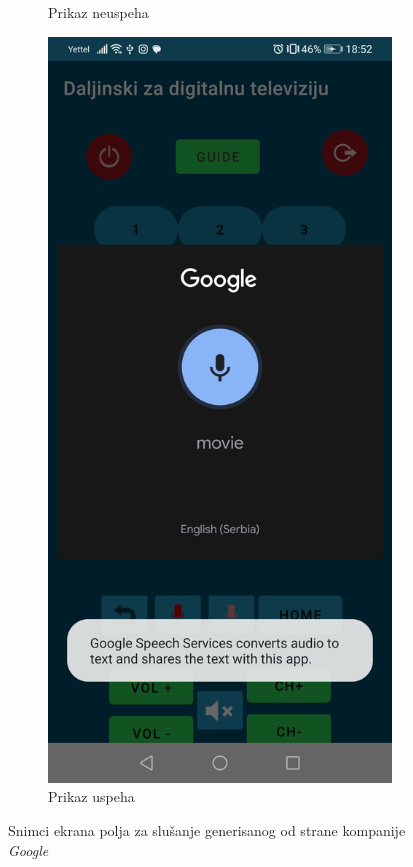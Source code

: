 \documentclass[implementacija.tex]{subfiles}
\begin{document}
\begin{figure}
\begin{subfigure}[b]{0.3\textwidth}
  \caption{Prikaz neuspeha}
    \end{subfigure}
    \hfill
    \begin{subfigure}[b]{0.3\textwidth}
        \centering
        \includegraphics[width=\textwidth,keepaspectratio]{Implementacija/snimci_ekrana/11_obican_google_uspesno.jpg}
  \caption{Prikaz uspeha}
   \label{fig:google_uspesno}
    \end{subfigure}
    \caption{Snimci ekrana polja za slušanje generisanog od strane kompanije \textit{Google}}
    \label{fig:obavestenja}
\end{figure}
\end{document}

